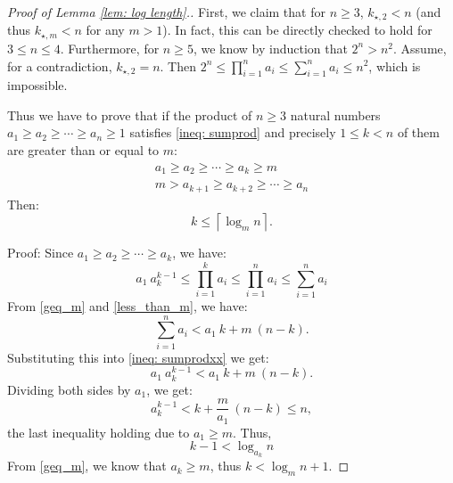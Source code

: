 \documentclass[10pt]{article}
\theoremstyle{definition}
\newtheorem{definition}{Definition}
\theoremstyle{remark}
\numberwithin{equation}{section}
\newcommand{\ceil}[1]{\left\lceil #1 \right\rceil}
\begin{document}
\begin{proof}[Proof of Lemma \ref{lem: log length}.]
First, we claim that for $n\geq 3$, $k_{\star,2}<n$ (and thus $k_{\star,m}<n$ for any $m>1$). In fact, this can be directly checked to hold for $3\leq n\leq 4$. Furthermore, for $n\geq 5$, we know by induction that $2^n>n^2$. Assume, for a contradiction, $k_{\star,2}=n$. Then $2^n\leq \prod_{i=1}^n a_i\leq\sum_{i=1}^na_i\leq n^2$, which is impossible. 

Thus we have to prove that if the product of $n \geq 3$ natural numbers $a_1 \geq a_2 \geq \cdots \geq a_n \geq 1$ satisfies \eqref{ineq: sumprod} and precisely $1\leq k<n$ of them are greater than or equal to $m$:
    \begin{gather}
        a_1 \geq a_2 \geq \cdots \geq a_k \geq m \label{geq_m} \\
        m > a_{k+1} \geq a_{k+2} \geq \cdots \geq a_n \label{less_than_m}
    \end{gather}
    Then:
    \[ k \leq \ceil {\log_m n}. \]

Proof: Since $a_1 \geq a_2 \geq \cdots \geq a_k$, we have:
    \begin{equation}\label{ineq: sumprodxx} 
        a_1 \ a_k^{k-1} \leq \prod_{i=1}^k a_i \leq \prod_{i=1}^n a_i\leq  \sum_{i=1}^n a_i
    \end{equation}
    From \eqref{geq_m} and \eqref{less_than_m}, we have:
    \begin{equation}\label{not_strict}
        \sum_{i=1}^n a_i < a_1 \ k +  m \ (n-k).
    \end{equation}
    Substituting this into \eqref{ineq: sumprodxx} we get:
    \[
        a_1 \ a_k^{k-1} < a_1 \ k + m \ (n-k).
    \]
    Dividing both sides by $a_1$, we get:
    \[
        a_k^{k-1} < k + \frac{m}{a_1} \ (n - k)\leq n,
    \]
the last inequality holding due to $a_1 \geq m$. Thus,
    \[
        k-1 < \log_{a_k} n
    \]
    From \eqref{geq_m}, we know that $a_k \geq m$, thus    $k < \log_m n + 1$.
\end{proof}

\end{document}
